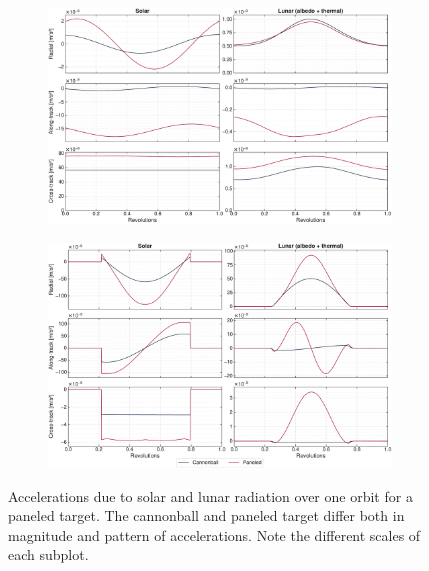 \begin{figure}[tb]
    \centering
    \begin{subfigure}[c]{\textwidth}
        \includegraphics[width=\textwidth]{figures/plots/acc_solarvslunar_jun.pdf}
        \label{fig:acc-solarvslunar-jun}
     \end{subfigure}

     \bigskip

     \begin{subfigure}[c]{\textwidth}
        \includegraphics[width=\textwidth]{figures/plots/acc_solarvslunar_sep.pdf}
        \label{fig:acc-solarvslunar-sep}
     \end{subfigure}

    \caption{Accelerations due to solar and lunar radiation over one orbit for a paneled target. The cannonball and paneled target differ both in magnitude and pattern of accelerations. Note the different scales of each subplot.}
    \label{fig:acc-solarvslunar}
\end{figure}

